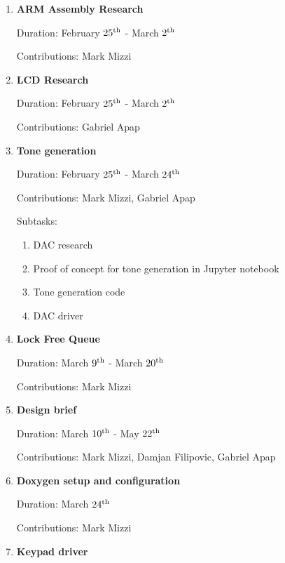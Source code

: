 \documentclass[11pt,a4paper,twocolumn]{scrartcl}
\begin{document}
\begin{enumerate}
   \item \textbf{ARM Assembly Research}

      Duration: February $25\textsuperscript{th}$ - March $2\textsuperscript{th}$
   
      Contributions: Mark Mizzi   

   \item \textbf{LCD Research}
   
      Duration: February $25\textsuperscript{th}$ - March $2\textsuperscript{th}$

      Contributions: Gabriel Apap

   \item \textbf{Tone generation}
   
      Duration: February $25\textsuperscript{th}$ - March $24\textsuperscript{th}$

      Contributions: Mark Mizzi, Gabriel Apap

      Subtasks:
      \begin{enumerate}
         \item DAC research
         \item Proof of concept for tone generation in Jupyter notebook
         \item Tone generation code
         \item DAC driver
      \end{enumerate}

   \item \textbf{Lock Free Queue}
      
      Duration: March $9\textsuperscript{th}$ - March $20\textsuperscript{th}$

      Contributions: Mark Mizzi

   \item \textbf{Design brief}
      
         Duration: March $10\textsuperscript{th}$ - May $22\textsuperscript{th}$
   
         Contributions: Mark Mizzi, Damjan Filipovic, Gabriel Apap
   

   \item \textbf{Doxygen setup and configuration}
   
      Duration: March $24\textsuperscript{th}$
   
      Contributions: Mark Mizzi

   \item \textbf{Keypad driver}


\end{enumerate}
\end{document}
